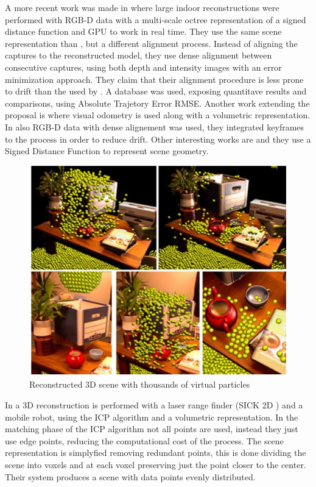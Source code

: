 A more recent work was made in \cite{Steinbrucker_2013_ICCV} where large indoor reconstructions were performed 
with RGB-D data with a multi-scale octree representation of a signed distance function and GPU to work in real time. They use 
the same scene representation than  \cite{izadi}, but a different alignment process. Instead of aligning the captures to the reconstructed 
model, they use dense alignment between consecutive captures, 
using both depth and intensity images with an error  minimization approach. They claim that their alignment procedure is less prone to drift than
 the used by \cite{izadi}. A database was used, exposing quantitave results and comparisons, using Absolute Trajetory Error RMSE. Another work 
extending the \cite{izadi} proposal is \cite{Whelan13} where visual odometry is used along with a volumetric representation. In \cite{KerlSC13} also RGB-D data with dense alignement was used, they integrated keyframes to the process in order to reduce drift. Other 
interesting works are \cite{bylow-sturm-etal} and \cite{quadrocopter} they use a Signed Distance Function to represent scene geometry. 


\begin{figure}[h!]
\begin{center}
\includegraphics[scale=0.34]{images/izadi}
\caption{Reconstructed 3D scene with thousands of virtual particles}
\label{fig:izadi}
\end{center}
\end{figure}


In \cite{keqiang} a 3D reconstruction is performed with a laser range finder (SICK 2D ) and a mobile robot, 
using the ICP algorithm and a volumetric representation. In the matching phase of the ICP algorithm not all
 points are used, instead they just use edge points, reducing the computational cost of the process. The scene 
 representation is simplyfied removing redundant points, this is done dividing the scene into voxels and at each 
 voxel preserving just the point closer to the center. Their system produces a scene with data points evenly 
 distributed.

